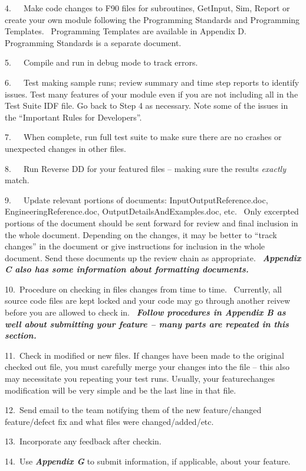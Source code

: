 4.~~~Make code changes to F90 files for subroutines, GetInput, Sim, Report or create your own module following the Programming Standards and Programming Templates.~ Programming Templates are available in Appendix D.~ Programming Standards is a separate document.

5.~~~Compile and run in debug mode to track errors.

6.~~~Test making sample runs; review summary and time step reports to identify issues. Test many features of your module even if you are not including all in the Test Suite IDF file. Go back to Step 4 as necessary. Note some of the issues in the ``Important Rules for Developers''.

7.~~~When complete, run full test suite to make sure there are no crashes or unexpected changes in other files.

8.~~~Run Reverse DD for your featured files -- making sure the results \emph{exactly} match.

9.~~~Update relevant portions of documents: InputOutputReference.doc, EngineeringReference.doc, OutputDetailsAndExamples.doc, etc.~ Only excerpted portions of the document should be sent forward for review and final inclusion in the whole document. Depending on the changes, it may be better to ``track changes'' in the document or give instructions for inclusion in the whole document. Send these documents up the review chain as appropriate.~ \textbf{\emph{Appendix C also has some information about formatting documents.}}

10.~Procedure on checking in files changes from time to time.~ Currently, all source code files are kept locked and your code may go through another reivew before you are allowed to check in.~ \textbf{\emph{Follow procedures in Appendix B as well about submitting your feature -- many parts are repeated in this section.}}

11.~Check in modified or new files. If changes have been made to the original checked out file, you must carefully merge your changes into the file -- this also may necessitate you repeating your test runs. Usually, your featurechanges modification will be very simple and be the last line in that file.

12.~Send email to the team notifying them of the new feature/changed feature/defect fix and what files were changed/added/etc.

13.~Incorporate any feedback after checkin.

14.~Use \textbf{\emph{Appendix G}} to submit information, if applicable, about your feature.
